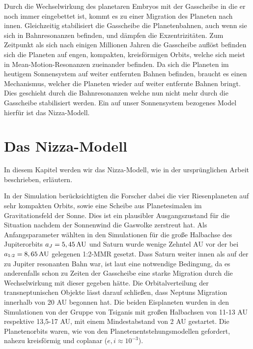 \documentclass[12pt,a4paper,twoside]{article}
\renewcommand{\cite}{\citep}
\begin{document}
Durch die Wechselwirkung des planetaren Embryos mit der Gasscheibe in die er noch immer eingebettet ist, kommt es zu einer Migration des Planeten nach innen. Gleichzeitig stabilisiert die Gasscheibe die Planetenbahnen, auch wenn sie sich in Bahnresonanzen befinden, und dämpfen die Exzentrizitäten. Zum Zeitpunkt als sich nach einigen Millionen Jahren die Gasscheibe auflöst befinden sich die Planeten auf engen, kompakten, kreisförmigen Orbits, welche sich meist in Mean-Motion-Resonanzen zueinander befinden\cite{Nesvorny2011}.
Da sich die Planeten im heutigem Sonnensystem auf weiter entfernten Bahnen befinden, braucht es einen Mechanismus, welcher die Planeten wieder auf weiter entfernte Bahnen bringt. Dies geschieht durch die Bahnresonanzen welche nun nicht mehr durch die Gasscheibe stabilisiert werden. Ein auf unser Sonnensystem bezogenes Model hierfür ist das Nizza-Modell.

\section{Das Nizza-Modell}\label{Orbits}
In diesem Kapitel werden wir das Nizza-Modell, wie in der ursprünglichen Arbeit\cite{Tsiganis2005} beschrieben, erläutern. %

In der Simulation berücksichtigten die Forscher dabei die vier Riesenplaneten auf sehr kompakten Orbits, sowie eine Scheibe aus Planetesimalen im Gravitationsfeld der Sonne. %
Dies ist ein plausibler Ausgangszustand für die Situation nachdem der Sonnenwind die Gaswolke %
zerstreut hat. %
Als Anfangsparameter wählten \cite{Tsiganis2005} in den Simulationen für die große Halbachse des Jupiterorbits $a_J = \unit[5,45]{AU}$ und Saturn wurde wenige Zehntel AU vor der bei $a_{1:2} = \unit[8,65]{AU}$ gelegenen 1:2-MMR gesetzt.
Dass Saturn weiter innen als auf der zu Jupiter resonanten Bahn war, ist laut \cite{Levison2008} eine notwendige Bedingung, da es anderenfalls schon zu Zeiten der Gasscheibe eine starke Migration durch die Wechselwirkung mit dieser gegeben hätte. %
Die Orbitalverteilung der transneptunischen Objekte lässt darauf schließen, dass Neptuns Migration innerhalb von 20 AU begonnen hat\cite{Tsiganis2005}.
Die beiden Eisplaneten wurden in den Simulationen von der Gruppe von Tsiganis mit großen Halbachsen von 11-13 AU respektive 13,5-17 AU, mit einem Mindestabstand von 2 AU gestartet.
Die Planetenorbits waren, wie von den Planetenentstehungsmodellen gefordert, %
nahezu kreisförmig und coplanar ($e, i \approx 10^{-3}$).
\end{document}
